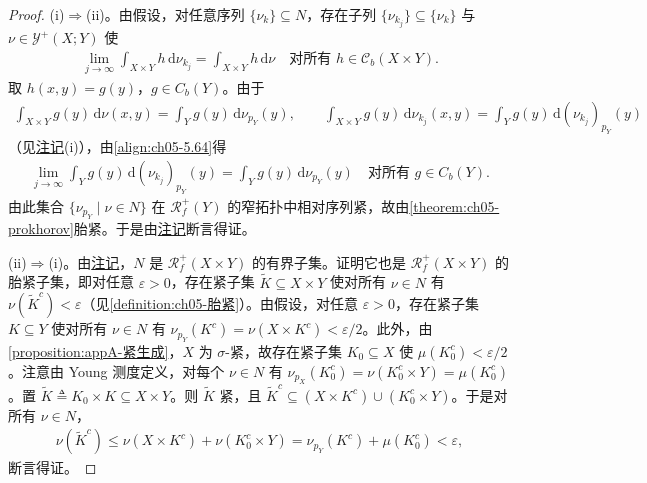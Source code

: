 \documentclass[../../main.tex]{subfiles}%
\begin{document}
\begin{proof}
(i)$\Rightarrow$(ii)。由假设，对任意序列 $\{\nu_k\}\subseteq N$，存在子列 $\{\nu_{k_j}\}\subseteq\{\nu_k\}$ 与 $\nu\in\mathcal{Y}^+(X;Y)$ 使
\begin{align}
\lim_{j\to\infty}\int_{X\times Y}h\,\mathrm{d}\nu_{k_j}
=\int_{X\times Y}h\,\mathrm{d}\nu
\quad\text{对所有 }h\in\mathcal{C}_b(X\times Y).\label{align:ch05-5.64}
\end{align}
取 $h(x,y)=g(y)$，$g\in C_b(Y)$。由于
\begin{align*}
\int_{X\times Y}g(y)\,\mathrm{d}\nu(x,y)=\int_Y g(y)\,\mathrm{d}\nu_{p_Y}(y),
\qquad
\int_{X\times Y}g(y)\,\mathrm{d}\nu_{k_j}(x,y)=\int_Y g(y)\,\mathrm{d}(\nu_{k_j})_{p_Y}(y)
\end{align*}
（见\hyperref[remark:ch02-Young投影]{注记}(i)），由\eqref{align:ch05-5.64}得
\begin{align*}
\lim_{j\to\infty}\int_Y g(y)\,\mathrm{d}(\nu_{k_j})_{p_Y}(y)
=\int_Y g(y)\,\mathrm{d}\nu_{p_Y}(y)
\quad\text{对所有 }g\in C_b(Y).
\end{align*}
由此集合 $\{\nu_{p_Y}\mid\nu\in N\}$ 在 $\mathscr{R}^+_f(Y)$ 的窄拓扑中相对序列紧，故由\cref{theorem:ch05-prokhorov}胎紧。于是由\hyperref[remark:ch05-Young胎紧投影]{注记}断言得证。

(ii)$\Rightarrow$(i)。由\hyperref[remark:ch02-Young投影]{注记}，$N$ 是 $\mathscr{R}^+_f(X\times Y)$ 的有界子集。证明它也是 $\mathscr{R}^+_f(X\times Y)$ 的胎紧子集，即对任意 $\varepsilon>0$，存在紧子集 $\tilde{K}\subseteq X\times Y$ 使对所有 $\nu\in N$ 有 $\nu(\tilde{K}^c)<\varepsilon$（见\cref{definition:ch05-胎紧}）。由假设，对任意 $\varepsilon>0$，存在紧子集 $K\subseteq Y$ 使对所有 $\nu\in N$ 有 $\nu_{p_Y}(K^c)=\nu(X\times K^c)<\varepsilon/2$。此外，由\cref{proposition:appA-紧生成}，$X$ 为 $\sigma$-紧，故存在紧子集 $K_0\subseteq X$ 使 $\mu(K_0^c)<\varepsilon/2$。注意由 Young 测度定义，对每个 $\nu\in N$ 有 $\nu_{p_X}(K_0^c)=\nu(K_0^c\times Y)=\mu(K_0^c)$。置 $\tilde{K}\triangleq K_0\times K\subseteq X\times Y$。则 $\tilde{K}$ 紧，且 $\tilde{K}^c\subseteq(X\times K^c)\cup(K_0^c\times Y)$。于是对所有 $\nu\in N$，
\begin{align*}
\nu(\tilde{K}^c)\leqslant\nu(X\times K^c)+\nu(K_0^c\times Y)
=\nu_{p_Y}(K^c)+\mu(K_0^c)<\varepsilon,
\end{align*}
断言得证。


\end{proof}
\end{document}
